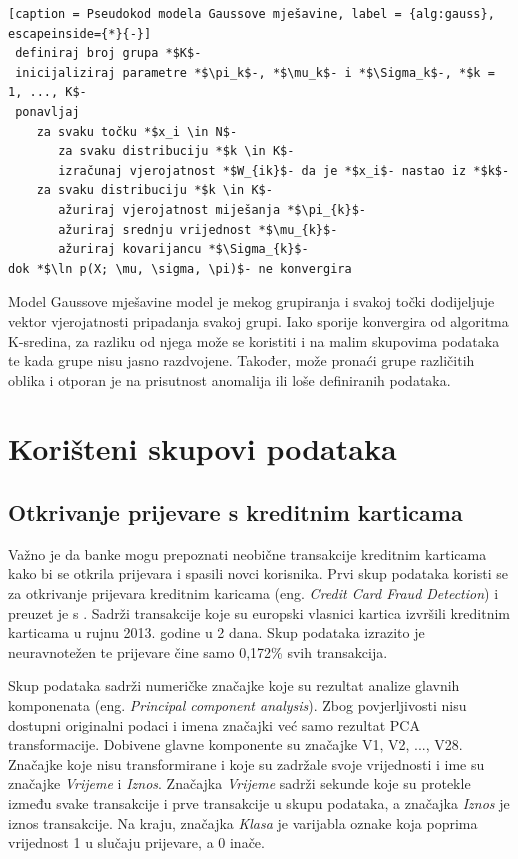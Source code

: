 \documentclass[utf8, diplomski, numeric]{fer}
\begin{document}
\begin{lstlisting}[caption = Pseudokod modela Gaussove mješavine, label = {alg:gauss}, escapeinside={*}{-}]
 definiraj broj grupa *$K$-
 inicijaliziraj parametre *$\pi_k$-, *$\mu_k$- i *$\Sigma_k$-, *$k = 1, ..., K$-
 ponavljaj
    za svaku točku *$x_i \in N$-
       za svaku distribuciju *$k \in K$-
	   izračunaj vjerojatnost *$W_{ik}$- da je *$x_i$- nastao iz *$k$-
    za svaku distribuciju *$k \in K$-
       ažuriraj vjerojatnost miješanja *$\pi_{k}$-
       ažuriraj srednju vrijednost *$\mu_{k}$-
       ažuriraj kovarijancu *$\Sigma_{k}$-
dok *$\ln p(X; \mu, \sigma, \pi)$- ne konvergira 

\end{lstlisting}

Model Gaussove mješavine model je mekog grupiranja i svakoj točki dodijeljuje vektor vjerojatnosti pripadanja svakoj grupi. Iako sporije konvergira od algoritma K-sredina, za razliku od njega može se koristiti i na malim skupovima podataka te kada grupe nisu jasno razdvojene. Također, može pronaći grupe različitih oblika i otporan je na prisutnost anomalija ili loše definiranih podataka.


\chapter{Korišteni skupovi podataka}
\section{Otkrivanje prijevare s kreditnim karticama}
Važno je da banke mogu prepoznati neobične transakcije kreditnim karticama kako bi se otkrila prijevara i spasili novci korisnika. Prvi skup podataka koristi se za otkrivanje prijevara kreditnim karicama (eng. \textit{Credit Card Fraud Detection}) i preuzet je s \cite{pang2021deep}. Sadrži transakcije koje su europski vlasnici kartica izvršili kreditnim karticama u rujnu 2013. godine u 2 dana. Skup podataka izrazito je neuravnotežen te prijevare čine samo 0,172\% svih transakcija.

Skup podataka sadrži numeričke značajke koje su rezultat analize glavnih komponenata (eng. \textit{Principal component analysis}). Zbog povjerljivosti nisu dostupni originalni podaci i imena značajki već samo rezultat PCA transformacije. Dobivene glavne komponente su značajke V1, V2, ..., V28. Značajke koje nisu transformirane i koje su zadržale svoje vrijednosti i ime su značajke \textit{Vrijeme} i \textit{Iznos}. Značajka \textit{Vrijeme} sadrži sekunde koje su protekle između svake transakcije i prve transakcije u skupu podataka, a značajka \textit{Iznos} je iznos transakcije. Na kraju, značajka \textit{Klasa} je varijabla oznake koja poprima vrijednost 1 u slučaju prijevare, a 0 inače.
\end{document}
